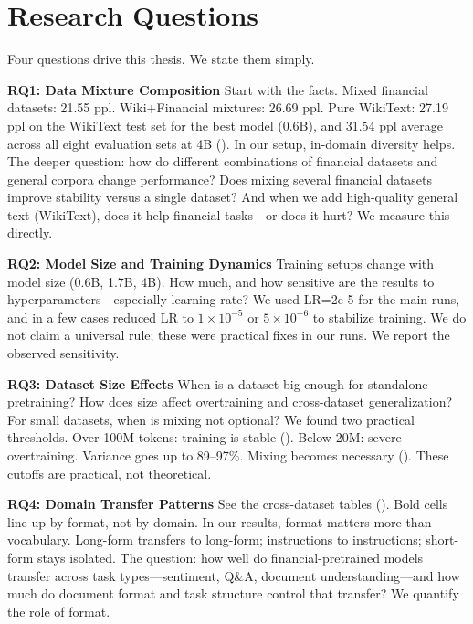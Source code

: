 \section{Research Questions}

Four questions drive this thesis. We state them simply.

\textbf{RQ1: Data Mixture Composition}
Start with the facts. Mixed financial datasets: 21.55 ppl. Wiki+Financial mixtures: 26.69 ppl. Pure WikiText: 27.19 ppl on the WikiText test set for the best model (0.6B), and 31.54 ppl average across all eight evaluation sets at 4B (). In our setup, in-domain diversity helps. The deeper question: how do different combinations of financial datasets and general corpora change performance? Does mixing several financial datasets improve stability versus a single dataset? And when we add high-quality general text (WikiText), does it help financial tasks—or does it hurt? We measure this directly.

\textbf{RQ2: Model Size and Training Dynamics}
Training setups change with model size (0.6B, 1.7B, 4B). How much, and how sensitive are the results to hyperparameters—especially learning rate? We used LR=2e-5 for the main runs, and in a few cases reduced LR to $1\times10^{-5}$ or $5\times10^{-6}$ to stabilize training. We do not claim a universal rule; these were practical fixes in our runs. We report the observed sensitivity.

\textbf{RQ3: Dataset Size Effects}
When is a dataset big enough for standalone pretraining? How does size affect overtraining and cross-dataset generalization? For small datasets, when is mixing not optional? We found two practical thresholds. Over 100M tokens: training is stable (). Below 20M: severe overtraining. Variance goes up to 89--97\%. Mixing becomes necessary (). These cutoffs are practical, not theoretical.

\textbf{RQ4: Domain Transfer Patterns}
See the cross-dataset tables (). Bold cells line up by format, not by domain. In our results, format matters more than vocabulary. Long-form transfers to long-form; instructions to instructions; short-form stays isolated. The question: how well do financial-pretrained models transfer across task types—sentiment, Q\&A, document understanding—and how much do document format and task structure control that transfer? We quantify the role of format.

